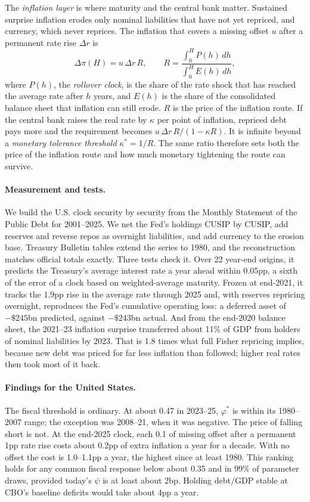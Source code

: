 The \emph{inflation layer} is where maturity and the central bank matter. Sustained surprise inflation erodes only nominal liabilities that have not yet repriced, and currency, which never reprices. The inflation that covers a missing offset $u$ after a permanent rate rise $\Delta r$ is
\begin{equation}
\Delta\pi(H)=u\,\Delta r\,R,\qquad R=\frac{\int_0^H P(h)\,dh}{\int_0^H E(h)\,dh},
\end{equation}
where $P(h)$, the \emph{rollover clock}, is the share of the rate shock that has reached the average rate after $h$ years, and $E(h)$ is the share of the consolidated balance sheet that inflation can still erode. $R$ is the price of the inflation route. If the central bank raises the real rate by $\kappa$ per point of inflation, repriced debt pays more and the requirement becomes $u\,\Delta r\,R/(1-\kappa R)$. It is infinite beyond a \emph{monetary tolerance threshold} $\kappa^*=1/R$. The same ratio therefore sets both the price of the inflation route and how much monetary tightening the route can survive.

\paragraph{Measurement and tests.} We build the U.S. clock security by security from the Monthly Statement of the Public Debt for 2001--2025. We net the Fed's holdings CUSIP by CUSIP, add reserves and reverse repos as overnight liabilities, and add currency to the erosion base. Treasury Bulletin tables extend the series to 1980, and the reconstruction matches official totals exactly. Three tests check it. Over 22 year-end origins, it predicts the Treasury's average interest rate a year ahead within 0.05pp, a sixth of the error of a clock based on weighted-average maturity. Frozen at end-2021, it tracks the 1.9pp rise in the average rate through 2025 and, with reserves repricing overnight, reproduces the Fed's cumulative operating loss: a deferred asset of $-\$245$bn predicted, against $-\$243$bn actual. And from the end-2020 balance sheet, the 2021--23 inflation surprise transferred about 11\% of GDP from holders of nominal liabilities by 2023. That is 1.8 times what full Fisher repricing implies, because new debt was priced for far less inflation than followed; higher real rates then took most of it back.

\paragraph{Findings for the United States.} The fiscal threshold is ordinary. At about 0.47 in 2023--25, $\varphi^*$ is within its 1980--2007 range; the exception was 2008--21, when it was negative. The price of falling short is not. At the end-2025 clock, each 0.1 of missing offset after a permanent 1pp rate rise costs about 0.2pp of extra inflation a year for a decade. With no offset the cost is 1.0--1.1pp a year, the highest since at least 1980. This ranking holds for any common fiscal response below about 0.35 and in 99\% of parameter draws, provided today's $\psi$ is at least about 2bp. Holding debt/GDP stable at CBO's baseline deficits would take about 4pp a year.

